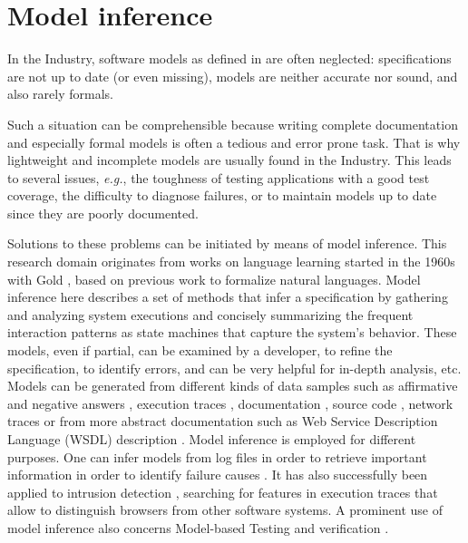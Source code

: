 \section{Model inference}
\label{sec:related:modelinf}

In the Industry, software models as defined in
 are
often neglected: specifications are not up to date (or even
missing), models are neither accurate nor sound, and also rarely
formals.

Such a situation can be comprehensible because writing complete
documentation and especially formal models is often a tedious and
error prone task. That is why lightweight and incomplete models
are usually found in the Industry. This leads to several issues,
\emph{e.g.}, the toughness of testing applications with a good test
coverage, the difficulty to diagnose failures, or to maintain
models up to date since they are poorly documented.

Solutions to these problems can be initiated by means of model
inference. This research domain originates from works on language
learning started in the 1960s with Gold \cite{Gold1978302}, based
on previous work to formalize natural languages. Model inference
here describes a set of methods that infer a specification by
gathering and analyzing system executions and concisely
summarizing the frequent interaction patterns as state machines
that capture the system's behavior. These models, even if
partial, can be examined by a developer, to refine the
specification, to identify errors, and can be very helpful for
in-depth analysis, etc. Models can be generated from different
kinds of data samples such as affirmative and negative answers
\cite{Angluin198787}, execution traces
\cite{Krka:2010:UDE:1810295.1810324}, documentation
\cite{ZhongZXM11}, source code
\cite{Salah05scenariographer,Pradel:2009}, network traces
\cite{6079839} or from more abstract documentation such as Web
Service Description Language (WSDL)
description \cite{Bertolino:2009:ASB:1595696.1595719}.  Model
inference is employed for different purposes. One can infer
models from log files in order to retrieve important information
in order to identify failure causes \cite{4700316}. It has also
successfully been applied to intrusion detection \cite{debar00},
searching for features in execution traces that allow to
distinguish browsers from other software systems. A prominent use
of model inference also concerns Model-based Testing
\cite{Lorenzoli2008,tap2011,MobiGUITARIEEESoftware2014} and
verification \cite{Ammons:2002:MS:565816.503275}.

